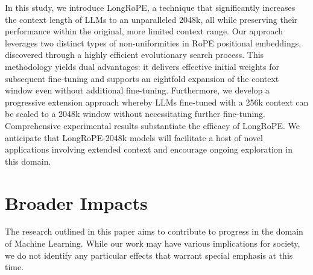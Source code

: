In this study, we introduce LongRoPE, a technique that significantly increases the context length of LLMs to an unparalleled 2048k, all while preserving their performance within the original, more limited context range. Our approach leverages two distinct types of non-uniformities in RoPE positional embeddings, discovered through a highly efficient evolutionary search process. This methodology yields dual advantages: it delivers effective initial weights for subsequent fine-tuning and supports an eightfold expansion of the context window even without additional fine-tuning. Furthermore, we develop a progressive extension approach whereby LLMs fine-tuned with a 256k context can be scaled to a 2048k window without necessitating further fine-tuning. Comprehensive experimental results substantiate the efficacy of LongRoPE. We anticipate that LongRoPE-2048k models will facilitate a host of novel applications involving extended context and encourage ongoing exploration in this domain.

\section*{Broader Impacts} The research outlined in this paper aims to contribute to progress in the domain of Machine Learning. While our work may have various implications for society, we do not identify any particular effects that warrant special emphasis at this time.

	\balance

